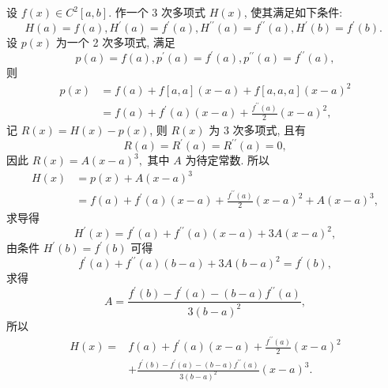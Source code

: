    
   \begin{tcolorbox}[enhanced,colback=10,colframe=9,breakable,coltitle=green!25!black,title=2024]
 设 $ f(x) \in C^{2}[a, b] $. 作一个 3 次多项式 $ H(x) $, 使其满足如下条件:
$$
H(a)=f(a), H^{\prime}(a)=f^{\prime}(a), H^{\prime \prime}(a)=f^{\prime \prime}(a), H^{\prime}(b)=f^{\prime}(b) \text {. }
$$
\tcblower
设 $ p(x) $ 为一个 2 次多项式, 满足
$$
p(a)=f(a), p^{\prime}(a)=f^{\prime}(a), p^{\prime \prime}(a)=f^{\prime \prime}(a),
$$
则
$$
\begin{aligned}
p(x) & =f(a)+f[a, a](x-a)+f[a, a, a](x-a)^{2} \\
& =f(a)+f^{\prime}(a)(x-a)+\frac{f^{\prime \prime}(a)}{2}(x-a)^{2},
\end{aligned}
$$
记 $ R(x)=H(x)-p(x) $, 则 $ R(x) $ 为 3 次多项式, 且有
$$
R(a)=R^{\prime}(a)=R^{\prime \prime}(a)=0,
$$
因此
$R(x)=A(x-a)^{3},$ 其中 $ A $ 为待定常数. 所以
$$
\begin{aligned}
H(x) & =p(x)+A(x-a)^{3} \\
& =f(a)+f^{\prime}(a)(x-a)+\frac{f^{\prime \prime}(a)}{2}(x-a)^{2}+A(x-a)^{3},
\end{aligned}
$$
求导得
$$
H^{\prime}(x)=f^{\prime}(a)+f^{\prime \prime}(a)(x-a)+3 A(x-a)^{2},
$$
由条件 $ H^{\prime}(b)=f^{\prime}(b) $ 可得
$$
f^{\prime}(a)+f^{\prime \prime}(a)(b-a)+3 A(b-a)^{2}=f^{\prime}(b),
$$
求得
$$
A=\frac{f^{\prime}(b)-f^{\prime}(a)-(b-a) f^{\prime \prime}(a)}{3(b-a)^{2}},
$$
所以
$$
\begin{aligned}
H(x)= & f(a)+f^{\prime}(a)(x-a)+\frac{f^{\prime \prime}(a)}{2}(x-a)^{2} \\
& +\frac{f^{\prime}(b)-f^{\prime}(a)-(b-a) f^{\prime \prime}(a)}{3(b-a)^{2}}(x-a)^{3} .
\end{aligned}
$$
   \end{tcolorbox}

